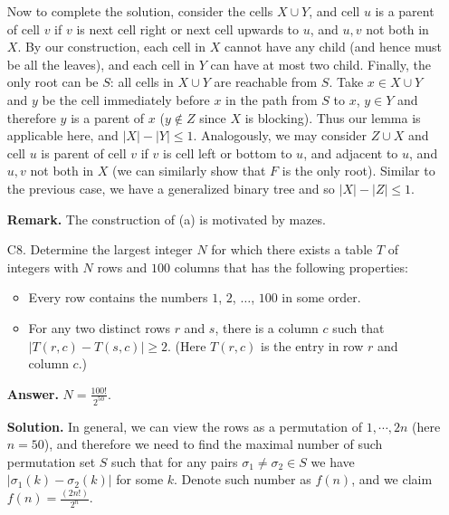 \documentclass[11pt,a4paper]{article}
\begin{document}
\begin{enumerate}
        Now to complete the solution, consider the cells $X\cup Y$, 
        and cell $u$ is a parent of cell $v$ if $v$ is next cell right or next cell upwards to $u$, 
        and $u, v$ not both in $X$. 
        By our construction, each cell in $X$ cannot have any child (and hence must be all the leaves), 
        and each cell in $Y$ can have at most two child. 
        Finally, the only root can be $S$: 
        all cells in $X\cup Y$ are reachable from $S$. 
        Take $x\in X\cup Y$ and $y$ be the cell immediately before $x$ in the path from $S$ to $x$, 
        $y\in Y$ and therefore $y$ is a parent of $x$ 
        ($y\not\in Z$ since $X$ is blocking). 
        Thus our lemma is applicable here, and $|X|-|Y|\le 1$. 
        Analogously, 
        we may consider $Z\cup X$ 
        and cell $u$ is parent of cell $v$ if $v$ is cell left or bottom to $u$, and adjacent to $u$, 
        and $u, v$ not both in $X$ (we can similarly show that $F$ is the only root). 
        Similar to the previous case, we have a generalized binary tree and so $|X|-|Z|\le 1$. 
        
        \textbf{Remark.} The construction of (a) is motivated by mazes. 
	    
	    \item [C8.] 
	    Determine the largest integer $N$ for which there exists a table $T$ of integers with $N$ rows and $100$ columns that has the following properties:
	    \begin{itemize}
	    	\item Every row contains the numbers $1$, $2$, $\ldots$, $100$ in some order.
	    	
	    	\item For any two distinct rows $r$ and $s$, there is a column $c$ such that $|T(r,c) - T(s, c)|\geq 2$. (Here $T(r,c)$ is the entry in row $r$ and column $c$.)
	    \end{itemize}
        
        \textbf{Answer.} $N = \frac{100!}{2^{50}}$. 
        
        \textbf{Solution.} 
        In general, we can view the rows as a permutation of $1, \cdots, 2n$ (here $n=50$), 
        and therefore we need to find the maximal number of such permutation set $S$ such that for any pairs $\sigma_1\neq \sigma_2\in S$ we have $|\sigma_1(k)-\sigma_2(k)|$ for some $k$. 
        Denote such number as $f(n)$, and we claim $f(n)=\frac{(2n!)}{2^n}$. 
        

\end{enumerate}
\end{document}
